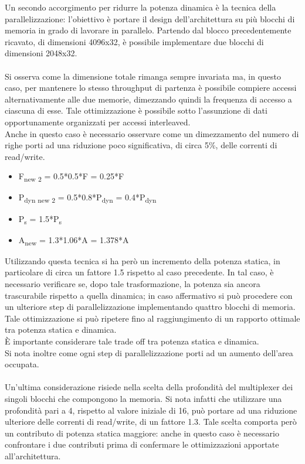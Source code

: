 \documentclass[11pt,  english, makeidx, a4paper, titlepage, oneside]{book}
\begin{document}
Un secondo accorgimento per ridurre la potenza dinamica è la tecnica della parallelizzazione: l'obiettivo è portare il design dell'architettura su più blocchi di memoria in grado di lavorare in parallelo. Partendo dal blocco precedentemente ricavato, di dimensioni 4096x32, è possibile implementare due blocchi di dimensioni 2048x32.
\\\\
Si osserva come la dimensione totale rimanga sempre invariata ma, in questo caso, per mantenere lo stesso throughput di partenza è possibile compiere accessi alternativamente alle due memorie, dimezzando quindi la frequenza di accesso a ciascuna di esse. Tale ottimizzazione è possibile sotto l'assunzione di dati opportunamente organizzati per accessi interleaved.
\\
Anche in questo caso è necessario osservare come un dimezzamento del numero di righe porti ad una riduzione poco significativa, di circa 5\%, delle correnti di read/write.
\\
\begin{itemize}
\item F\textsubscript{new 2} = 0.5*0.5*F = 0.25*F
\item P\textsubscript{dyn new 2} = 0.5*0.8*P\textsubscript{dyn} = 0.4*P\textsubscript{dyn}
\item P\textsubscript{s} = 1.5*P\textsubscript{s}
\item A\textsubscript{new} = 1.3*1.06*A = 1.378*A
\end{itemize}
\vspace{0.3cm}
Utilizzando questa tecnica si ha però un incremento della potenza statica, in particolare di circa un fattore 1.5 rispetto al caso precedente. In tal caso, è necessario verificare se, dopo tale trasformazione, la potenza sia ancora trascurabile rispetto a quella dinamica; in caso affermativo si può procedere con un ulteriore step di parallelizzazione implementando quattro blocchi di memoria. Tale ottimizzazione si può ripetere fino al raggiungimento di un rapporto ottimale tra potenza statica e dinamica.
\\
È importante considerare tale trade off tra potenza statica e dinamica.
\\
Si nota inoltre come ogni step di parallelizzazione porti ad un aumento dell'area occupata.
\\\\
Un'ultima considerazione risiede nella scelta della profondità del multiplexer dei singoli blocchi che compongono la memoria. Si nota infatti che utilizzare una profondità pari a 4, rispetto al valore iniziale di 16, può portare ad una riduzione ulteriore delle correnti di read/write, di un fattore 1.3. Tale scelta comporta però un contributo di potenza statica maggiore: anche in questo caso è necessario confrontare i due contributi prima di confermare le ottimizzazioni apportate all'architettura.
\end{document}
